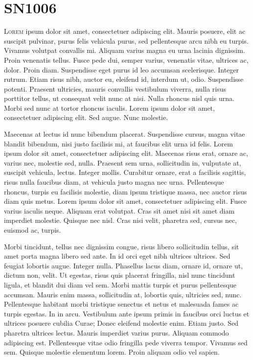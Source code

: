 \chapter{SN1006}
\label{chap:SN1006}

\lettrine[lines=4]{L}{orem} ipsum dolor sit amet, consectetuer
adipiscing elit. Mauris posuere, elit ac suscipit pulvinar, purus
felis vehicula purus, sed pellentesque arcu nibh eu turpis. Vivamus
volutpat convallis mi. Aliquam varius magna eu urna lacinia
dignissim. Proin venenatis tellus. Fusce pede dui, semper varius,
venenatis vitae, ultrices ac, dolor. Proin diam. Suspendisse eget
purus id leo accumsan scelerisque. Integer rutrum. Etiam risus nibh,
auctor eu, eleifend id, interdum ut, odio. Suspendisse
potenti. Praesent ultricies, mauris convallis vestibulum viverra,
nulla risus porttitor tellus, ut consequat velit nunc at nisi. Nulla
rhoncus nisl quis urna. Morbi sed nunc at tortor rhoncus
iaculis. Lorem ipsum dolor sit amet, consectetuer adipiscing elit. Sed
augue. Nunc molestie.

Maecenas at lectus id nunc bibendum placerat. Suspendisse cursus,
magna vitae blandit bibendum, nisi justo facilisis mi, at faucibus
elit urna id felis. Lorem ipsum dolor sit amet, consectetuer
adipiscing elit. Maecenas risus erat, ornare ac, varius nec, molestie
sed, nulla. Praesent sem urna, sollicitudin in, vulputate at, suscipit
vehicula, lectus. Integer mollis. Curabitur ornare, erat a facilisis
sagittis, risus nulla faucibus diam, at vehicula justo magna nec
urna. Pellentesque rhoncus, turpis eu facilisis molestie, diam ipsum
tristique massa, nec auctor risus diam quis metus. Lorem ipsum dolor
sit amet, consectetuer adipiscing elit. Fusce varius iaculis
neque. Aliquam erat volutpat. Cras sit amet nisi sit amet diam
imperdiet molestie. Quisque nec nisl. Cras nisi velit, pharetra sed,
cursus nec, euismod ac, turpis.

Morbi tincidunt, tellus nec dignissim congue, risus libero
sollicitudin tellus, sit amet porta magna libero sed ante. In id orci
eget nibh ultrices ultrices. Sed feugiat lobortis augue. Integer
nulla. Phasellus lacus diam, ornare id, ornare ut, dictum non,
velit. Ut egestas, risus quis placerat fringilla, nisl nunc tincidunt
ligula, et blandit dui diam vel sem. Morbi mattis turpis et purus
pellentesque accumsan. Mauris enim massa, sollicitudin at, lobortis
quis, ultricies sed, nunc. Pellentesque habitant morbi tristique
senectus et netus et malesuada fames ac turpis egestas. In in
arcu. Vestibulum ante ipsum primis in faucibus orci luctus et ultrices
posuere cubilia Curae; Donec eleifend molestie enim. Etiam justo. Sed
pharetra ultrices lectus. Mauris imperdiet varius purus. Aliquam
commodo adipiscing est. Pellentesque vitae odio fringilla pede viverra
tempor. Vivamus sed sem. Quisque molestie elementum lorem. Proin
aliquam odio vel sapien.

